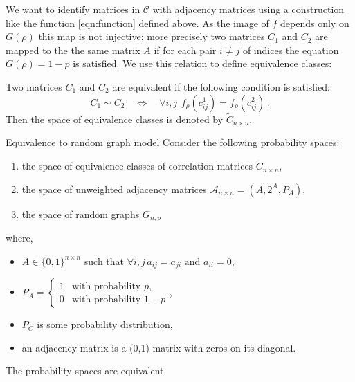 We want to identify matrices in $\mathcal{C}$ with adjacency matrices using a construction like the function \ref{eqn:function} defined above.
As the image of $f$ depends only on $G(\rho)$  this map is not injective; more precisely two matrices $C_1$ and $C_2$ are mapped to the the same matrix $A$ if for each pair $i\neq j$ of indices the equation  $G(\rho) = 1-p$ is satisfied.
We use this relation to define equivalence classes:

\begin{definition}
\label{def:equiv_correlation}
Two matrices $C_1$ and $C_2$ are equivalent if the following condition is satisfied:
\begin{equation}C_1\sim C_2\quad \Leftrightarrow \quad \forall i,j \,\ f_{\rho}(c^1_{ij}) = f_{\rho}(c^2_{ij})\,.\end{equation}
Then the space of equivalence classes is denoted by $\widetilde{C}_{n\times n}$. 
\end{definition}



\begin{theorem}{Equivalence to random graph model}
\label{thm:equivalence_random_graph_model}
Consider the following probability spaces:
\begin{enumerate}
	\item the space of equivalence classes of correlation matrices $\widetilde{C}_{n\times n}$,
	\item the space of unweighted adjacency matrices $\mathcal{A}_{n\times n} = \left( A, 2^A, P_A \right)$,
	\item the space of random graphs $G_{n,p}$
\end{enumerate}
\noindent where,
\begin{itemize}
	\item[] $A \in \{0,1\}^{n \times n}$ such that $\forall i,j\,  a_{ij} = a_{ji} \text{ and } a_{ii} = 0$,
	\item[] $P_A = \begin{cases} 1 & \text{with probability } p,\\0 & \text{with probability } 1-p\end{cases}$,
	\item[] $P_C$ is some probability distribution,
	\item[] an adjacency matrix is a (0,1)-matrix with zeros on its diagonal.
\end{itemize}
The probability spaces are equivalent.
\end{theorem}

